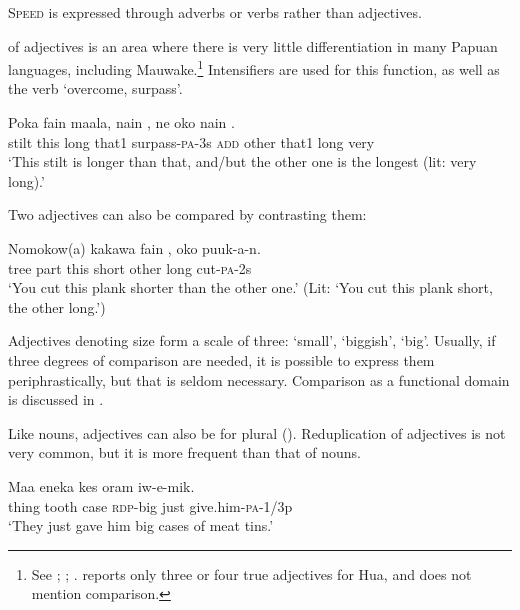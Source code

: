 \textsc{Speed} is expressed through adverbs or verbs rather than adjectives.

 of adjectives is an area where there is very little differentiation in many Papuan languages, including Mauwake.\footnote{See \citet[134--135]{Roberts1987}; \citet[68]{Reesink1987}; \citet[63--64]{Hardin2002}. \citet[268]{Haiman1980} reports only three or four true adjectives for Hua, and does not mention comparison.} Intensifiers are used for this function, as well as the verb  `overcome, surpass'. 

\ea%
\label{ex:3:x81}
\gll Poka fain maala, nain , ne oko nain  .\\
stilt this long that1 surpass-\textsc{pa}-3s \textsc{add} other that1 long very\\
\glt`This stilt is longer than that, and/but the other one is the longest (lit: very long).'
\z

Two adjectives can also be compared by contrasting them: 

\ea%
\label{ex:3:x441}
\gll Nomokow(a) kakawa fain , oko  puuk-a-n. \\
tree part this short other long cut-\textsc{pa}-2s\\
\glt`You cut this plank shorter than the other one.' (Lit: `You cut this plank short, the other long.')
\z

Adjectives denoting size form a scale of three:  `small',  `biggish',  `big'. Usually, if three degrees of comparison are needed, it is possible to express them periphrastically, but that is seldom necessary. Comparison as a functional domain is discussed in . 

Like nouns, adjectives can also be  for plural (). Reduplication of adjectives is not very common, but it is more frequent than that of nouns. 

\ea%
\label{ex:3:x85}
\gll Maa eneka kes  oram iw-e-mik. \\
thing tooth case \textsc{rdp}-big just give.him-\textsc{pa}-1/3p\\
\glt`They just gave him big cases of meat tins.'
\z

